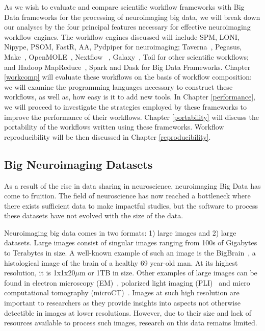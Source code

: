         As we wish to evaluate and compare scientific workflow frameworks with
        Big Data frameworks for the processing of neuroimaging big data, we will
        break down our analyses by the four principal features necessary for
        effective neuroimaging workflow engines. The workflow engines discussed
        will include SPM, LONI, Nipype, PSOM, FastR, AA, Pydpiper 
        for neuroimaging; Taverna~\cite{doi:10.1093/bioinformatics/bth361}, 
        Pegasus, Make~\cite{10.3389/fninf.2016.00002}, 
        OpenMOLE~\cite{passerat2014openmole}, Nextflow~\cite{Di-Tommaso:2017aa}
        , Galaxy~\cite{Goecks2010}, 
        Toil for other scientific workflows; and Hadoop 
        MapReduce~\cite{Dean:2008:MSD:1327452.1327492}, Spark and Dask for
        Big Data Frameworks. Chapter \ref{workcomp} will evaluate these 
        workflows on the basis of workflow composition: we will %
        examine the programming languages necessary to construct these workflows,
        as well as, how easy is it to add new tools. In Chapter 
        \ref{performance}, we will proceed to 
        investigate the strategies employed by these frameworks to improve the 
        performance of their workflows. Chapter \ref{portability} will discuss
        the portability of the workflows written using these frameworks. 
        Workflow reproducibility will be then discussed in Chapter 
        \ref{reproducibility}.
        

        \subsection{Big Neuroimaging Datasets}\label{datasets}

            As a result of the rise in data sharing in neuroscience, 
            neuroimaging
            Big Data has come to fruition. The field of neuroscience has now
            reached a bottleneck where there exists sufficient data to make
            impactful studies, but the software to process these datasets have 
            not evolved with the size of the data.

            Neuroimaging big data comes in two formats: 1) large images and 2) 
            large datasets. Large images consist of singular images ranging 
            from 100s of Gigabytes to Terabytes in size. A well-known example 
            of 
            such an image is the BigBrain~\cite{Amunts1472}, a histological 
            image 
            of the brain of a healthy 69 year-old man. At its highest resolution,
            it is 1x1x20$\mu$m or 1TB in
            size. Other examples of large images can be found in electron 
            microscopy (EM)~\cite{Hildebrand:2017aa}, polarized light imaging 
            (PLI)~\cite{10.1007/978-3-319-12084-3_1} and micro computational
            tomography (microCT)~\cite{10.1371/journal.pone.0035691}. 
            Images at 
            such high resolution are important to researchers as they provide 
            insights into aspects not otherwise detectible in images at lower 
            resolutions. However, due to their size and lack of resources 
            available to process such images, research on this data remains 
            limited.

